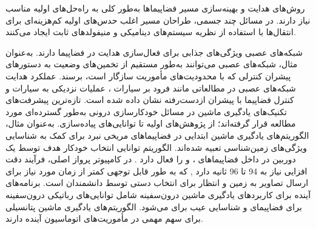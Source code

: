\documentclass[a4paper]{article}
\begin{document}
{روش‌های هدایت و بهینه‌سازی مسیر فضاپیماها به‌طور کلی به راه‌حل‌های اولیه مناسب نیاز دارند. در مسائل چند جسمی، طراحان مسیر اغلب حدس‌های اولیه کم‌هزینه‌ای برای انتقال‌ها با استفاده از نظریه سیستم‌های دینامیکی و منیفولدهای ثابت
\cite{2013AcAau, Haapala}
 ایجاد می‌کنند. 




شبکه‌های عصبی ویژگی‌های جذابی برای فعال‌سازی هدایت در فضاپیما دارند. به‌عنوان مثال، شبکه‌های عصبی می‌توانند به‌طور مستقیم از تخمین‌های وضعیت به دستورهای پیشران کنترلی که با محدودیت‌های مأموریت سازگار است، برسند. عملکرد هدایت شبکه‌های عصبی در مطالعاتی مانند فرود بر سیارات \cite{gaudet2020six}، عملیات نزدیکی به سیارات \cite{gaudet2020terminal} و کنترل فضاپیما با پیشران ازدست‌رفته \cite{rubinsztejn2020neural} نشان داده شده است.
تازه‌ترین پیشرفت‌های تکنیک‌های یادگیری ماشین در مسائل خودکارسازی درونی به‌طور گسترده‌ای مورد مطالعه قرار گرفته‌اند؛ از پژوهش‌های اولیه تا توانایی‌های پیاده‌سازی.
به‌عنوان مثال، الگوریتم‌های یادگیری ماشین ابتدایی در فضاپیماهای مریخی نبرد برای کمک به شناسایی ویژگی‌های زمین‌شناسی تعبیه شده‌اند. الگوریتم  توانایی انتخاب خودکار هدف توسط یک دوربین در داخل فضاپیماهای ،  و  را فعال دارد
\cite{estlin2012aegis}.
  در کامپیوتر پرواز اصلی، فرآیند دقت افزایی  نیاز به 94 تا 96 ثانیه دارد 
  \cite{francis2017aegis},
   که به طور قابل توجهی کمتر از زمان مورد نیاز برای ارسال تصاویر به زمین و انتظار برای انتخاب دستی توسط دانشمندان است.
   برنامه‌های آینده برای کاربردهای یادگیری ماشین درون‌سفینه شامل توانایی‌های رباتیکی درون‌سفینه برای فضاپیمای 
\cite{higa2019vision, rothrock2016spoc}
     و شناسایی عیب برای 
\cite{wagstaff2019enabling} می‌شود. الگوریتم‌های یادگیری ماشین پتانسیلی برای سهم مهمی در مأموریت‌های اتوماسیون آینده دارند.


}
\end{document}
